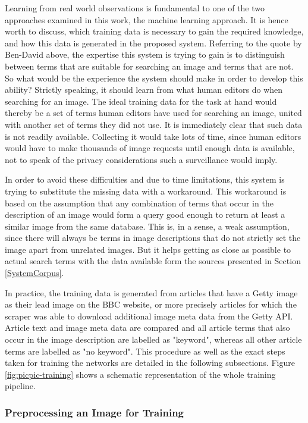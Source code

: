 \documentclass[11pt,a4paper,twoside]{article}
\begin{document}
\noindent Learning from real world observations is fundamental to one of the two approaches examined in this work, the machine learning approach. It is hence worth to discuss, which training data is necessary to gain the required knowledge, and how this data is generated in the proposed system. Referring to the quote by Ben-David above, the expertise this system is trying to gain is to distinguish between terms that are suitable for searching an image and terms that are not. So what would be the experience the system should make in order to develop this ability? Strictly speaking, it should learn from what human editors do when searching for an image. The ideal training data for the task at hand would thereby be a set of terms human editors have used for searching an image, united with another set of terms they did not use. It is immediately clear that such data is not readily available. Collecting it would take lots of time, since human editors would have to make thousands of image requests until enough data is available, not to speak of the privacy considerations such a surveillance would imply.

In order to avoid these difficulties and due to time limitations, this system is trying to substitute the missing data with a workaround. This workaround is based on the assumption that any combination of terms that occur in the description of an image would form a query good enough to return at least a similar image from the same database. This is, in a sense, a weak assumption, since there will always be terms in image descriptions that do not strictly set the image apart from unrelated images. But it helps getting as close as possible to actual search terms with the data available form the sources presented in Section \ref{SystemCorpus}.

In practice, the training data is generated from articles that have a Getty image as their lead image on the BBC website, or more precisely articles for which the scraper was able to download additional image meta data from the Getty API. Article text and image meta data are compared and all article terms that also occur in the image description are labelled as "keyword", whereas all other article terms are labelled as "no keyword". This procedure as well as the exact steps taken for training the networks are detailed in the following subsections. Figure \ref{fig:picpic-training} shows a schematic representation of the whole training pipeline.

\subsubsection{Preprocessing an Image for Training} \label{SystemTrainPreprocess}
\end{document}
